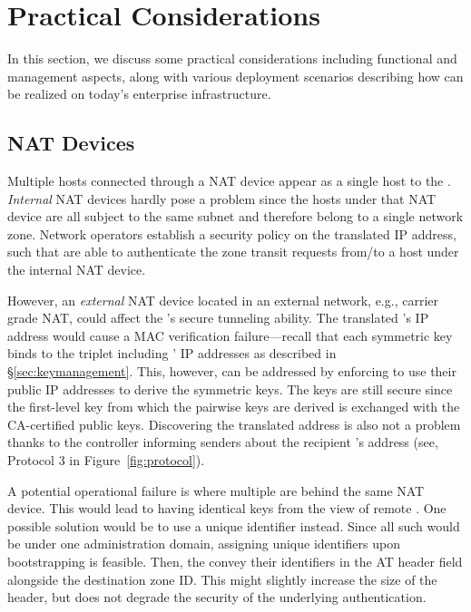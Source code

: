 \chapter{Practical Considerations}
\label{practical}

In this section, we discuss some practical considerations including functional and
management aspects, along with various deployment scenarios describing how \name can
be realized on today's enterprise infrastructure.


\section{NAT Devices}
\label{sec:nat}
Multiple hosts connected through a NAT device appear as a single host to the
\tp. \textit{Internal} NAT devices hardly pose a problem since the hosts under that NAT
device are all subject to the same subnet and therefore belong to a single network zone.
Network operators establish a security policy on the translated IP address, such
that \tps are able to authenticate the zone transit requests from/to a host under the
internal NAT device.

However, an \textit{external} NAT device located in an external network, e.g., carrier grade NAT,
could affect the \tp's secure tunneling ability. The translated \tp's IP address
would cause a MAC verification failure---recall that each symmetric key binds to the
triplet including \tps' IP addresses as described in \S\ref{sec:keymanagement}.
This, however, can be addressed by enforcing \tps to use their public IP addresses
to derive the symmetric keys. The keys are still secure since the first-level key
from which the pairwise keys are derived is exchanged with the CA-certified public
keys. Discovering the translated \tp address is also not a problem thanks to
the controller informing senders about the recipient \tp's address (see, Protocol 3 in
Figure~\ref{fig:protocol}).

A potential operational failure is where multiple \tps are behind the same NAT device.
This would lead to \tps having identical keys from the view of remote \tps. One possible solution
would be to use a unique \tp identifier instead. Since all such \tps would be under one administration domain, assigning unique \tp identifiers upon bootstrapping is feasible. Then, the \tps convey their identifiers in the AT header field alongside the destination zone ID. This
might slightly increase the size of the header, but does not degrade the security of
the underlying authentication.


